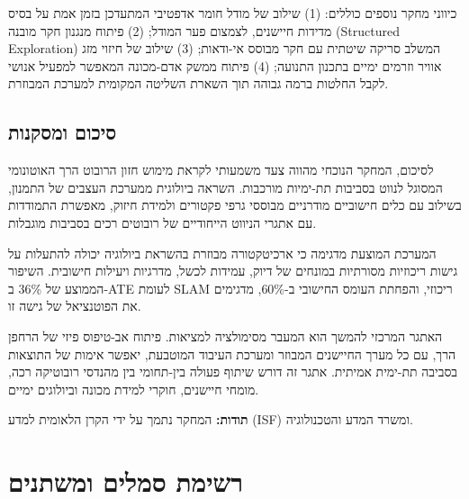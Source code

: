 כיווני מחקר נוספים כוללים: (1) שילוב של מודל חומר אדפטיבי המתעדכן בזמן אמת על בסיס מדידות חיישנים, לצמצום פער המודל; (2) פיתוח מנגנון חקר מובנה (Structured Exploration) המשלב סריקה שיטתית עם חקר מבוסס אי-ודאות; (3) שילוב של חיזוי מזג אוויר וזרמים ימיים בתכנון התנועה; (4) פיתוח ממשק אדם-מכונה המאפשר למפעיל אנושי לקבל החלטות ברמה גבוהה תוך השארת השליטה המקומית למערכת המבוזרת.

\subsection{סיכום ומסקנות}
\label{sec:ch09_summary}

לסיכום, המחקר הנוכחי מהווה צעד משמעותי לקראת מימוש חזון הרובוט הרך האוטונומי המסוגל לנווט בסביבות תת-ימיות מורכבות. השראה ביולוגית ממערכת העצבים של התמנון, בשילוב עם כלים חישוביים מודרניים מבוססי גרפי פקטורים ולמידת חיזוק, מאפשרת התמודדות עם אתגרי הניווט הייחודיים של רובוטים רכים בסביבות מוגבלות.

המערכת המוצעת מדגימה כי ארכיטקטורה מבוזרת בהשראת ביולוגיה יכולה להתעלות על גישות ריכוזיות מסורתיות במונחים של דיוק, עמידות לכשל, מדרגיות ויעילות חישובית. השיפור הממוצע של 36\% ב-ATE לעומת SLAM ריכוזי, והפחתת העומס החישובי ב-60\%, מדגימים את הפוטנציאל של גישה זו.

האתגר המרכזי להמשך הוא המעבר מסימולציה למציאות. פיתוח אב-טיפוס פיזי של הרחפן הרך, עם כל מערך החיישנים המבוזר ומערכת העיבוד המוטבעת, יאפשר אימות של התוצאות בסביבה תת-ימית אמיתית. אתגר זה דורש שיתוף פעולה בין-תחומי בין מהנדסי רובוטיקה רכה, מומחי חיישנים, חוקרי למידת מכונה וביולוגים ימיים.

\medskip
\noindent\textbf{תודות:} המחקר נתמך על ידי הקרן הלאומית למדע (ISF) ומשרד המדע והטכנולוגיה.

\appendix
\section{רשימת סמלים ומשתנים}
\label{sec:ch09_appendix}

